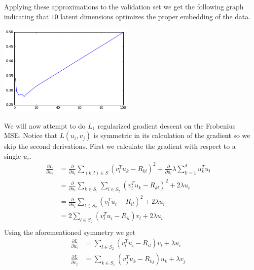 \documentclass[letter]{article}
\newenvironment{menumerate}{%
  \edef\backupindent{\the\parindent}%
  \enumerate%
  \setlength{\parindent}{\backupindent}%
}{\endenumerate}
\begin{document}
\begin{menumerate}
\begin{menumerate}
  Applying these approximations to the validation set we get the following graph indicating that $10$ latent dimensions optimizes
  the proper embedding of the data.

  \begin{center}
  \includegraphics[width=0.5\textwidth]{index.png}
  \end{center}

  \item We will now attempt to do $L_1$ regularized gradient descent on the Frobenius MSE. Notice that $L(u_i, v_j)$ is symmetric
  in its calculation of the gradient so we skip the second derivations. First we calculate the gradient with respect to a single $u_i$.
  \begin{equation*}
    \begin{aligned}
        \frac{\partial L}{\partial u_i} &= \frac{\partial}{\partial u_i} \sum_{(k,l) \in S} (v^T_lu_k - R_{kl})^2 + \frac{\partial}{\partial u_i} \lambda \sum_{k=1}^d u_k^Tu_l \\
         &= \frac{\partial}{\partial u_i} \sum_{k \in S_1} \sum_{l \in S_2} (v^T_lu_k - R_{kl})^2 + 2 \lambda u_i  \\
         &= \frac{\partial}{\partial u_i} \sum_{l \in S_2} (v^T_lu_i - R_{il})^2 + 2 \lambda u_i  \\
         &= 2 \sum_{l \in S_2} (v_l^Tu_i - R_{il})v_l + 2 \lambda u_i  \\
     \end{aligned} 
  \end{equation*}
  Using the aforementioned symmetry we get
  \begin{equation}
    \begin{aligned}
        \frac{\partial L}{\partial u_i} &= \sum_{l \in S_2} (v_l^Tu_i - R_{il})v_l + \lambda u_i \\
        \frac{\partial L}{\partial v_j} &= \sum_{k \in S_1} (v_j^Tu_k - R_{kj})u_k + \lambda v_j 
    \end{aligned}
  \end{equation}


\end{menumerate}
\end{menumerate}
\end{document}
